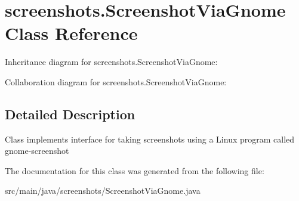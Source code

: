 \hypertarget{classscreenshots_1_1_screenshot_via_gnome}{}\section{screenshots.\+Screenshot\+Via\+Gnome Class Reference}
\label{classscreenshots_1_1_screenshot_via_gnome}


Inheritance diagram for screenshots.\+Screenshot\+Via\+Gnome\+:


Collaboration diagram for screenshots.\+Screenshot\+Via\+Gnome\+:


\subsection{Detailed Description}
Class implements interface for taking screenshots using a Linux program called gnome-\/screenshot 

The documentation for this class was generated from the following file\+:\begin{DoxyCompactItemize}
\item 
src/main/java/screenshots/Screenshot\+Via\+Gnome.\+java\end{DoxyCompactItemize}
